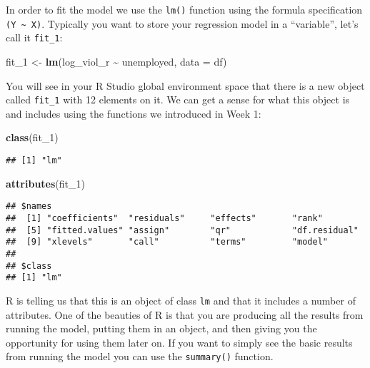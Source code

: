 \documentclass[
]{book}
\newenvironment{Shaded}{\begin{snugshade}}{\end{snugshade}}
\newcommand{\AttributeTok}[1]{\textcolor[rgb]{0.13,0.29,0.53}{#1}}
\newcommand{\FunctionTok}[1]{\textcolor[rgb]{0.13,0.29,0.53}{\textbf{#1}}}
\newcommand{\NormalTok}[1]{#1}
\newcommand{\OtherTok}[1]{\textcolor[rgb]{0.56,0.35,0.01}{#1}}
\newcommand{\SpecialCharTok}[1]{\textcolor[rgb]{0.81,0.36,0.00}{\textbf{#1}}}
\begin{document}
In order to fit the model we use the \texttt{lm()} function using the formula specification \texttt{(Y\ \textasciitilde{}\ X)}. Typically you want to store your regression model in a ``variable'', let's call it \texttt{fit\_1}:

\begin{Shaded}
\begin{Highlighting}[]
\NormalTok{fit\_1 }\OtherTok{\textless{}{-}} \FunctionTok{lm}\NormalTok{(log\_viol\_r }\SpecialCharTok{\textasciitilde{}}\NormalTok{ unemployed, }\AttributeTok{data =}\NormalTok{ df)}
\end{Highlighting}
\end{Shaded}

You will see in your R Studio global environment space that there is a new object called \texttt{fit\_1} with 12 elements on it. We can get a sense for what this object is and includes using the functions we introduced in Week 1:

\begin{Shaded}
\begin{Highlighting}[]
\FunctionTok{class}\NormalTok{(fit\_1)}
\end{Highlighting}
\end{Shaded}

\begin{verbatim}
## [1] "lm"
\end{verbatim}

\begin{Shaded}
\begin{Highlighting}[]
\FunctionTok{attributes}\NormalTok{(fit\_1)}
\end{Highlighting}
\end{Shaded}

\begin{verbatim}
## $names
##  [1] "coefficients"  "residuals"     "effects"       "rank"         
##  [5] "fitted.values" "assign"        "qr"            "df.residual"  
##  [9] "xlevels"       "call"          "terms"         "model"        
## 
## $class
## [1] "lm"
\end{verbatim}

R is telling us that this is an object of class \texttt{lm} and that it includes a number of attributes. One of the beauties of R is that you are producing all the results from running the model, putting them in an object, and then giving you the opportunity for using them later on. If you want to simply see the basic results from running the model you can use the \texttt{summary()} function.
\end{document}
